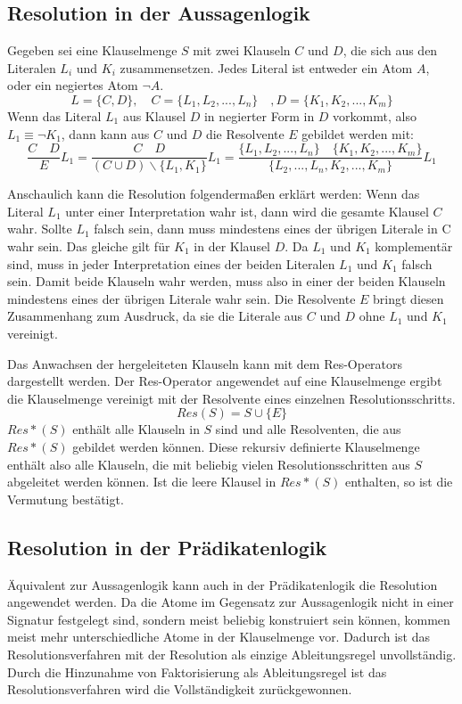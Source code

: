 		\subsection{Resolution in der Aussagenlogik}
Gegeben sei eine Klauselmenge $S$ mit zwei Klauseln $C$ und $D$, die sich aus den Literalen $L_i$ und $K_i$ zusammensetzen. Jedes Literal ist entweder ein Atom $A$, oder ein negiertes Atom $\neg A$.
$$L=\{C,D\}, \quad C=\{L_1, L_2, ..., L_n\}\quad, D=\{K_1, K_2, ..., K_m\}$$
Wenn das Literal $L_1$ aus Klausel $D$ in negierter Form in $D$ vorkommt, also $L_1\equiv\neg K_1$, dann kann aus $C$ und $D$ die Resolvente $E$ gebildet werden mit:
$$\frac{C\quad D}{E}L_1=\frac{C \quad D}{(C \cup D) \backslash \{L_1, K_1\}}L_1
= \frac{\{L_1, L_2, ..., L_n\}\quad\{K_1, K_2, ..., K_m\}}{\{L_2, ..., L_n, K_2, ..., K_m\}}L_1$$

Anschaulich kann die Resolution folgendermaßen erklärt werden: 
Wenn das Literal $L_1$ unter einer Interpretation wahr ist, dann wird die gesamte Klausel $C$ wahr. Sollte $L_1$ falsch sein, dann muss mindestens eines der übrigen Literale in C wahr sein.
Das gleiche gilt für $K_1$ in der Klausel $D$.
Da $L_1$ und $K_1$ komplementär sind, muss in jeder Interpretation eines der beiden Literalen $L_1$ und $K_1$ falsch sein. Damit beide Klauseln wahr werden, muss also in einer der beiden Klauseln mindestens eines der übrigen Literale wahr sein. Die Resolvente $E$ bringt diesen Zusammenhang zum Ausdruck, da sie die Literale aus $C$ und $D$ ohne $L_1$ und $K_1$ vereinigt.

Das Anwachsen der hergeleiteten Klauseln kann mit dem Res-Operators dargestellt werden. Der Res-Operator angewendet auf eine Klauselmenge ergibt die Klauselmenge vereinigt mit der Resolvente eines einzelnen Resolutionsschritts.
$$Res(S)=S \cup \{E\}$$
$Res*(S)$ enthält alle Klauseln in $S$ sind und alle Resolventen, die aus $Res*(S)$ gebildet werden können. Diese rekursiv definierte Klauselmenge enthält also alle Klauseln, die mit beliebig vielen Resolutionsschritten aus $S$ abgeleitet werden können. Ist die leere Klausel in $Res*(S)$ enthalten, so ist die Vermutung bestätigt.
		\subsection{Resolution in der Prädikatenlogik}
Äquivalent zur Aussagenlogik kann auch in der Prädikatenlogik die Resolution angewendet werden. Da die Atome im Gegensatz zur Aussagenlogik nicht in einer Signatur festgelegt sind, sondern meist beliebig konstruiert sein können, kommen meist mehr unterschiedliche Atome in der Klauselmenge vor. Dadurch ist das Resolutionsverfahren mit der Resolution als einzige Ableitungsregel unvollständig. Durch die Hinzunahme von Faktorisierung als Ableitungsregel ist das Resolutionsverfahren wird die Vollständigkeit zurückgewonnen.

